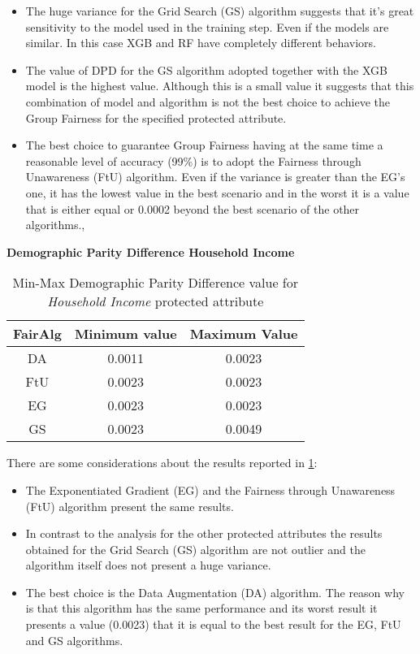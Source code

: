 \begin{itemize}
    \item The huge variance for the Grid Search (GS) algorithm suggests that it's great sensitivity to the model used in the training step. Even if the models are similar. In this case XGB and RF have completely different behaviors.

    \item The value of DPD for the GS algorithm adopted together with the XGB model is the highest value. Although this is a small value it suggests that this combination of model and algorithm is not the best choice to achieve the Group Fairness for the specified protected attribute.

    \item The best choice to guarantee Group Fairness having at the same time a reasonable level of accuracy (99\%) is to adopt the Fairness through Unawareness (FtU) algorithm. Even if the variance is greater than the EG's one, it has the lowest value in the best scenario and in the worst it is a value that is either equal or 0.0002 beyond the best scenario of the other algorithms., 
\end{itemize}

\newpage
\textbf{Demographic Parity Difference Household Income}
\begin{table}
    \centering
    \begin{tabular}{|c|c|c|}
        \hline
        \textbf{FairAlg} & \textbf{Minimum value} & \textbf{Maximum Value} \\
        \hline
        DA & 0.0011 & 0.0023 \\
        \hline
        FtU & 0.0023 & 0.0023 \\
        \hline
        EG & 0.0023 & 0.0023 \\
        \hline
        GS & 0.0023 & 0.0049 \\
        \hline
    \end{tabular}
    \caption{Min-Max Demographic Parity Difference value for \emph{Household Income} protected attribute}
    \label{tab:h_dpd}
\end{table}

There are some considerations about the results reported in \cref{tab:h_dpd}:

\begin{itemize}
    \item The Exponentiated Gradient (EG) and the Fairness through Unawareness (FtU) algorithm present the same results.

    \item In contrast to the analysis for the other protected attributes the results obtained for the Grid Search (GS) algorithm are not outlier and the algorithm itself does not present a huge variance.

    \item The best choice is the Data Augmentation (DA) algorithm. The reason why is that this algorithm has the same performance and its worst result it presents a value (0.0023) that it is equal to the best result for the EG, FtU and GS algorithms.
\end{itemize}

